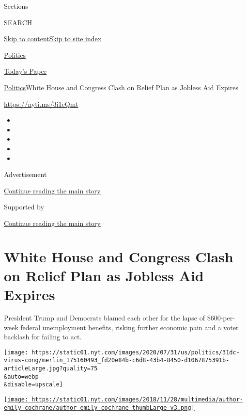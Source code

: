 Sections

SEARCH

\protect\hyperlink{site-content}{Skip to
content}\protect\hyperlink{site-index}{Skip to site index}

\href{https://www.nytimes.com/section/politics}{Politics}

\href{https://myaccount.nytimes.com/auth/login?response_type=cookie\&client_id=vi}{}

\href{https://www.nytimes.com/section/todayspaper}{Today's Paper}

\href{/section/politics}{Politics}\textbar{}White House and Congress
Clash on Relief Plan as Jobless Aid Expires

\url{https://nyti.ms/3i1eQmt}

\begin{itemize}
\item
\item
\item
\item
\item
\end{itemize}

Advertisement

\protect\hyperlink{after-top}{Continue reading the main story}

Supported by

\protect\hyperlink{after-sponsor}{Continue reading the main story}

\hypertarget{white-house-and-congress-clash-on-relief-plan-as-jobless-aid-expires}{%
\section{White House and Congress Clash on Relief Plan as Jobless Aid
Expires}\label{white-house-and-congress-clash-on-relief-plan-as-jobless-aid-expires}}

President Trump and Democrats blamed each other for the lapse of
\$600-per-week federal unemployment benefits, risking further economic
pain and a voter backlash for failing to act.

\texttt{[image: https://static01.nyt.com/images/2020/07/31/us/politics/31dc-virus-cong/merlin\_175160493\_fd20e84b-c6d8-43b4-8450-d1067875391b-articleLarge.jpg?quality=75\\\&auto=webp\\\&disable=upscale]}

\href{https://www.nytimes.com/by/emily-cochrane}{\texttt{[image: https://static01.nyt.com/images/2018/11/28/multimedia/author-emily-cochrane/author-emily-cochrane-thumbLarge-v3.png]}}

